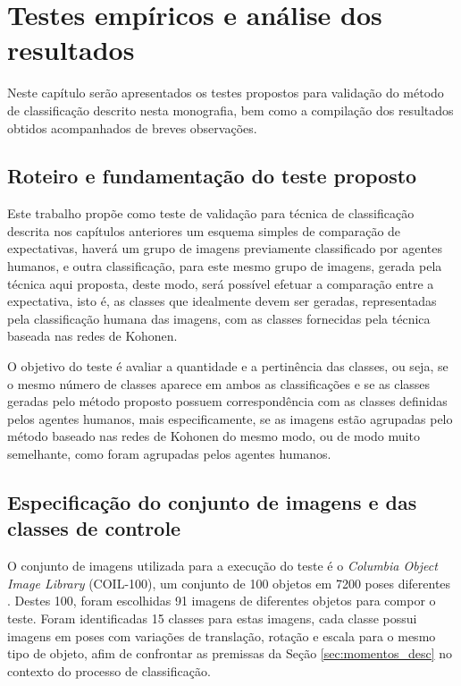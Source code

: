\chapter{Testes empíricos e análise dos resultados}

Neste capítulo serão apresentados os testes propostos para validação do método
de classificação descrito nesta monografia, bem como a compilação dos
resultados obtidos acompanhados de breves observações.

\section{Roteiro e fundamentação do teste proposto}

Este trabalho propõe como teste de validação para técnica de classificação
descrita nos capítulos anteriores um esquema simples de comparação de
expectativas, haverá um grupo de imagens previamente classificado por agentes
humanos, e outra classificação, para este mesmo grupo de imagens, gerada pela
técnica aqui proposta, deste modo, será possível efetuar a comparação entre a
expectativa, isto é, as classes que idealmente devem ser geradas, representadas
pela classificação humana das imagens, com as classes fornecidas pela técnica
baseada nas redes de Kohonen.

O objetivo do teste é avaliar a quantidade e a pertinência das classes, ou seja,
se o mesmo número de classes aparece em ambos as classificações e se as classes
geradas pelo método proposto possuem correspondência com as classes definidas
pelos agentes humanos, mais especificamente, se as imagens estão agrupadas pelo
método baseado nas redes de Kohonen do mesmo modo, ou de modo muito semelhante,
como foram agrupadas pelos agentes humanos.

\section{Especificação do conjunto de imagens e das classes de controle}
\label{sec:conjunto_de_imagens}

O conjunto de imagens utilizada para a execução do teste é o
\textit{Columbia Object Image Library} (COIL-100), um conjunto de 100
objetos em 7200 poses
diferentes \cite{Coil}. Destes 100, foram escolhidas 91 imagens de diferentes objetos para
compor o teste. Foram identificadas 15 classes para estas imagens, cada classe possui
imagens em poses com variações de translação, rotação e escala para o mesmo tipo
de objeto, afim de confrontar as premissas da Seção \ref{sec:momentos_desc} no
contexto do processo de classificação.

